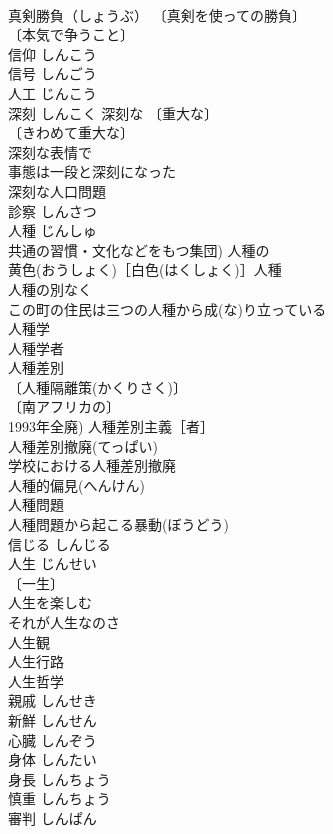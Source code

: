 \documentclass[8pt]{extreport}
\begin{document}
\begin{CJK}{UTF8}{min}
\\	真剣勝負（しょうぶ） 〔真剣を使っての勝負〕
\\	〔本気で争うこと〕
\\	信仰	しんこう	
\\	信号	しんごう	
\\	人工	じんこう	
\\	深刻	しんこく	深刻な 〔重大な〕
\\	〔きわめて重大な〕
\\	深刻な表情で 
\\	事態は一段と深刻になった 
\\	深刻な人口問題 
\\	診察	しんさつ	
\\	人種	じんしゅ	
\\	共通の習慣・文化などをもつ集団) 人種の 
\\	黄色(おうしょく)［白色(はくしょく)］人種 
\\	人種の別なく 
\\	この町の住民は三つの人種から成(な)り立っている 
\\	人種学 
\\	人種学者 
\\	人種差別 
\\	〔人種隔離策(かくりさく)〕
\\	〔南アフリカの〕
\\	1993年全廃) 人種差別主義［者］ 
\\	人種差別撤廃(てっぱい) 
\\	学校における人種差別撤廃 
\\	人種的偏見(へんけん) 
\\	人種問題 
\\	人種問題から起こる暴動(ぼうどう) 
\\	信じる	しんじる	
\\	人生	じんせい	
\\	〔一生〕
\\	人生を楽しむ 
\\	それが人生なのさ 
\\	人生観 
\\	人生行路 
\\	人生哲学 
\\	親戚	しんせき	
\\	新鮮	しんせん	
\\	心臓	しんぞう	
\\	身体	しんたい	
\\	身長	しんちょう	
\\	慎重	しんちょう	
\\	審判	しんぱん	

\end{CJK}
\end{document}

